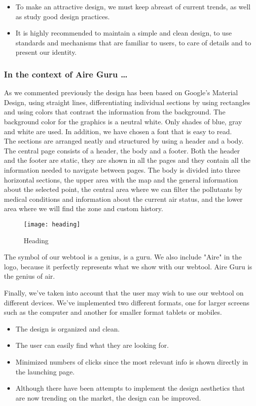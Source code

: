 \begin{itemize}
    \item To make an attractive design, we must keep abreast of current trends, as well as study good design practices.
    \item It is highly recommended to maintain a simple and clean design, to use standards and mechanisms that are familiar to users,
    to care of details and to present our identity.
\end{itemize}

\subsubsection*{In the context of Aire Guru \ldots}

As we commented previously the design has been based on Google's Material Design, using straight lines, differentiating individual sections by using rectangles and using colors that contrast the information from the background.
The background color for the graphics is a neutral white. Only shades of blue, gray and white are used. In addition, we have chosen a font that is easy to read.\\

The sections are arranged neatly and structured by using a header and a body.\\

The central page consists of a header, the body and a footer. Both the header and the footer are static,
they are shown in all the pages and they contain all the information needed to navigate between pages.
The body is divided into three horizontal sections, the upper area with the map and the general information about the selected point,
the central area where we can filter the pollutants by medical conditions and information about the current air status, and the
lower area where we will find the zone and custom history.

\begin{figure}[ht]
    \centering
    \texttt{[image: heading]}
    \caption{Heading}
\end{figure}
 
The symbol of our webtool is a genius, is a guru. We also include "Aire" in the logo, because it perfectly represents 
what we show with our webtool. Aire Guru is the genius of air.

Finally, we've taken into account that the user may wish to use our webtool on different devices. We've implemented
two different formats, one for larger screens such as the computer and another for smaller format tablets or mobiles.

\begin{itemize}
    \item The design is organized and clean. 
    \item The user can easily find what they are looking for.
    \item Minimized numbers of clicks since the most relevant info is shown directly in the launching page.
    \item Although there have been attempts to implement the design aesthetics that are now trending on the market, the design can be improved.
\end{itemize}